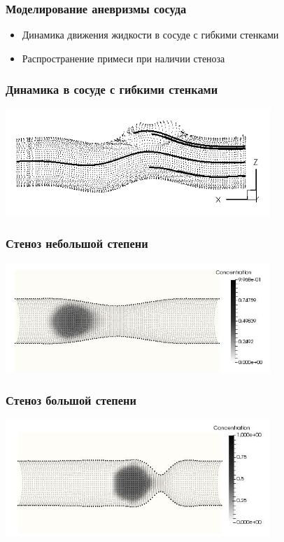\documentclass[14pt]{beamer}
\begin{document}
\begin{frame}
\frametitle{Моделирование аневризмы сосуда}
    \begin{itemize}
        \item[\MVRightarrow] Динамика движения жидкости в сосуде с гибкими стенками
        \item[\MVRightarrow] Распространение примеси при наличии стеноза
    \end{itemize}
\end{frame}

\begin{frame}
\frametitle{Динамика в сосуде с гибкими стенками}
    \begin{center}
        \includegraphics[width=10cm]{aneurysm_tracks.png}
    \end{center}
\end{frame}

\begin{frame}
\frametitle{Стеноз небольшой степени}
    \begin{center}
        \includegraphics[width=10cm]{small_stenosis.jpg}
    \end{center}
\end{frame}

\begin{frame}
\frametitle{Стеноз большой степени}
    \begin{center}
        \includegraphics[width=10cm]{large_stenosis.jpg}
    \end{center}
\end{frame}
\end{document}
